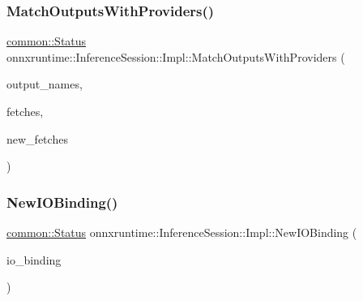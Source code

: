 \subsubsection{\texorpdfstring{Match\+Outputs\+With\+Providers()}{MatchOutputsWithProviders()}}
{\footnotesize\ttfamily \mbox{\hyperlink{classonnxruntime_1_1common_1_1Status}{common\+::\+Status}} onnxruntime\+::\+Inference\+Session\+::\+Impl\+::\+Match\+Outputs\+With\+Providers (\begin{DoxyParamCaption}\item[{const std\+::vector$<$ std\+::string $>$ \&}]{output\+\_\+names,  }\item[{std\+::vector$<$ \mbox{\hyperlink{classonnxruntime_1_1MLValue}{M\+L\+Value}} $>$ \&}]{fetches,  }\item[{std\+::vector$<$ \mbox{\hyperlink{classonnxruntime_1_1MLValue}{M\+L\+Value}} $>$ \&}]{new\+\_\+fetches }\end{DoxyParamCaption})\hspace{0.3cm}{\ttfamily [inline]}}

\mbox{\label{classonnxruntime_1_1InferenceSession_1_1Impl_a8650ce4e18b0a13a9e9f374d370ad8e5}} 
\subsubsection{\texorpdfstring{New\+I\+O\+Binding()}{NewIOBinding()}}
{\footnotesize\ttfamily \mbox{\hyperlink{classonnxruntime_1_1common_1_1Status}{common\+::\+Status}} onnxruntime\+::\+Inference\+Session\+::\+Impl\+::\+New\+I\+O\+Binding (\begin{DoxyParamCaption}\item[{std\+::unique\+\_\+ptr$<$ \mbox{\hyperlink{classonnxruntime_1_1IOBinding}{I\+O\+Binding}} $>$ $\ast$}]{io\+\_\+binding }\end{DoxyParamCaption})\hspace{0.3cm}{\ttfamily [inline]}}

\mbox{\label{classonnxruntime_1_1InferenceSession_1_1Impl_a5702a9154033b9e5c1a9a3956050e1fb}} 
